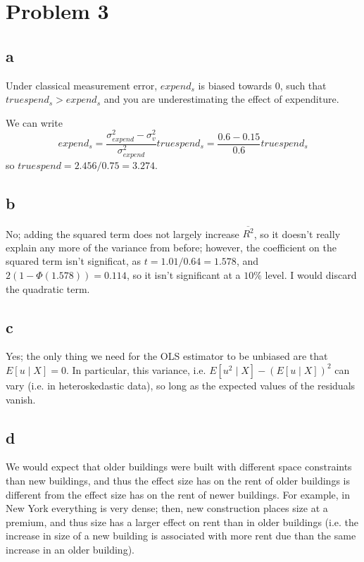 \documentclass[12pt,letterpaper]{article}
\theoremstyle{definition}
\begin{document}
\section*{Problem 3}
\subsection*{a}

Under classical measurement error, $expend_{s}$ is biased towards 0, such that $truespend_{s} > expend_{s}$ and you are underestimating the effect of expenditure.

We can write
\[
  expend_{s} = \frac{\sigma_{expend}^{2} - \sigma_{v}^{2}}{\sigma_{expend}^{2}}truespend_{s} = \frac{0.6 - 0.15}{0.6}truespend_{s}
\]
so $truespend = 2.456 / 0.75 = 3.274$.

\subsection*{b}

No; adding the squared term does not largely increase $\overline{R^{2}}$, so it doesn't really explain any more of the variance from before; however, the coefficient on the squared term isn't significat, as $t = 1.01/0.64 = 1.578$, and $2(1- \Phi(1.578)) = 0.114$, so it isn't significant at a $10\%$ level. I would discard the quadratic term.

\subsection*{c}

Yes; the only thing we need for the OLS estimator to be unbiased are that $E[u \mid X] = 0$. In particular, this variance, i.e. $E[u^{2} \mid X] - (E[u \mid X])^{2}$ can vary (i.e. in heteroskedastic data), so long as the expected values of the residuals vanish.

\subsection*{d}

We would expect that older buildings were built with different space constraints than new buildings, and thus the effect size has on the rent of older buildings is different from the effect size has on the rent of newer buildings. For example, in New York everything is very dense; then, new construction places size at a premium, and thus size has a larger effect on rent than in older buildings (i.e. the increase in size of a new building is associated with more rent due than the same increase in an older building).
\end{document}
